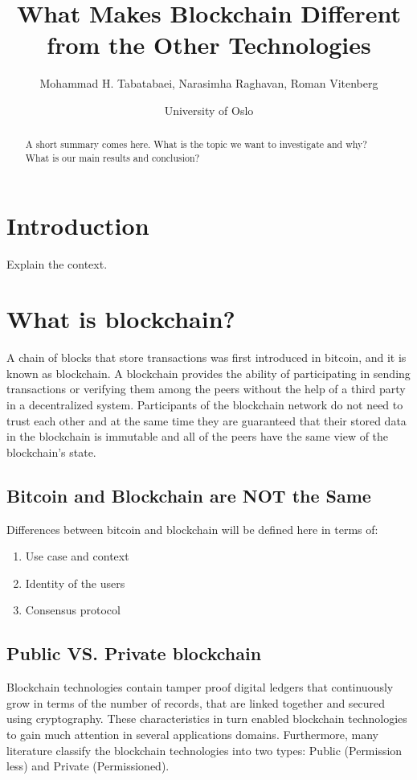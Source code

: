 \documentclass[a4paper]{article}
\title{What Makes Blockchain Different from the Other Technologies}
\author{Mohammad H. Tabatabaei, Narasimha Raghavan, Roman Vitenberg}
\date{University of Oslo}
\begin{document}
\maketitle

\begin{abstract}
A short summary comes here. What is the topic we want to investigate and why? What is our main results and conclusion?
\end{abstract}

\section{Introduction}
\label{sec:introduction}

Explain the context.

\section{What is blockchain?}
\label{sec:wib}

A chain of blocks that store transactions was first introduced in bitcoin, and it is known as blockchain. A blockchain provides the ability of participating in sending transactions or verifying them among the peers without the help of a third party in a decentralized system. Participants of the blockchain network do not need to trust each other and at the same time they are guaranteed that their stored data in the blockchain is immutable and all of the peers have the same view of the blockchain's state. 

\subsection{Bitcoin and Blockchain are NOT the Same}
\label{sec:bitcoinandblockchain}

Differences between bitcoin and blockchain will be defined here in terms of:
\begin{enumerate}
\item Use case and context
\item Identity of the users
\item Consensus protocol 
\end{enumerate}

\subsection{Public VS. Private blockchain}
\label{sec:publicvsprivate}

Blockchain technologies contain tamper proof digital ledgers that continuously grow in terms of the number of records, that are linked together and secured using cryptography. These characteristics in turn enabled blockchain technologies to  gain much attention in several applications domains. Furthermore, many literature classify the blockchain technologies into two types: Public (Permission less) and Private (Permissioned). 
\end{document}
